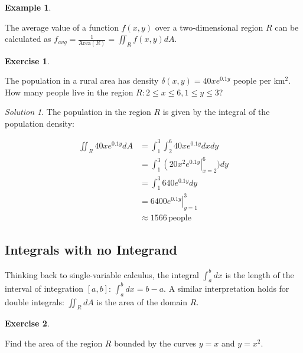 \documentclass[
]{book}
\theoremstyle{definition}
\theoremstyle{definition}
\newtheorem{example}{Example}[chapter]
\theoremstyle{definition}
\newtheorem{exercise}{Exercise}[chapter]
\theoremstyle{definition}
\theoremstyle{remark}
\newtheorem*{solution}{Solution}
\begin{document}
\begin{example}
\protect\hypertarget{exm:unlabeled-div-109}{}\label{exm:unlabeled-div-109}

The average value of a function \(f(x,y)\) over a two-dimensional region \(R\) can be calculated as \(\displaystyle f_{avg}=\frac{1}{\mbox{Area}(R)}=\iint_R f(x,y)dA\).

\end{example}

\begin{exercise}
\protect\hypertarget{exr:unlabeled-div-110}{}\label{exr:unlabeled-div-110}

The population in a rural area has density \(\delta(x,y)=40xe^{0.1y}\) people per km\(^2\). How many people live in the region \(R: 2\leq x \leq 6, 1\leq y\leq 3\)?

\end{exercise}

\begin{solution}

The population in the region \(R\) is given by the integral of the population density:

\begin{align*}
\displaystyle \iint_R 40xe^{0.1y} dA & = \int_1^3 \int_2^6 40xe^{0.1y} dxdy\\
&= \int_1^3 \left (20x^2e^{0.1y}\right |_{x=2}^6)dy \\
&= \int_1^3 640 e^{0.1y}dy\\
&= \left . 6400 e^{0.1y}\right |_{y=1}^3\\
& \approx 1566 \, \mbox{people}
\end{align*}

\end{solution}

\hypertarget{integrals-with-no-integrand}{%
\subsection{Integrals with no Integrand}\label{integrals-with-no-integrand}}

Thinking back to single-variable calculus, the integral \(\displaystyle \int_a^b dx\) is the length of the interval of integration \([a,b]\): \(\displaystyle \int_a^b dx=b-a\). A similar interpretation holds for double integrals: \(\displaystyle \iint_R dA\) is the area of the domain \(R\).

\begin{exercise}
\protect\hypertarget{exr:unlabeled-div-112}{}\label{exr:unlabeled-div-112}

Find the area of the region \(R\) bounded by the curves \(y=x\) and \(y=x^2\).

\end{exercise}
\end{document}
